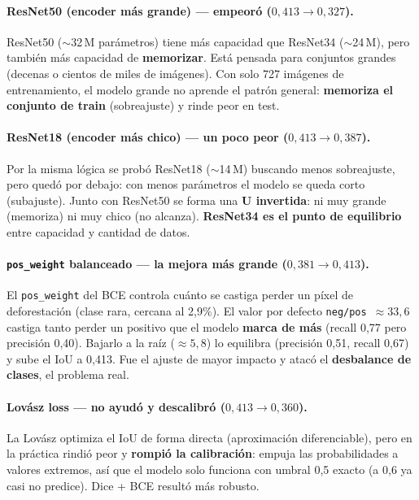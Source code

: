 \documentclass[onecolumn,conference]{IEEEtran}
\begin{document}
\paragraph{ResNet50 (encoder más grande) --- empeoró ($0{,}413 \to 0{,}327$).}
ResNet50 ($\sim$32\,M parámetros) tiene más capacidad que ResNet34 ($\sim$24\,M), pero
también más capacidad de \textbf{memorizar}. Está pensada para conjuntos grandes (decenas o
cientos de miles de imágenes). Con solo 727 imágenes de entrenamiento, el modelo grande no
aprende el patrón general: \textbf{memoriza el conjunto de train} (sobreajuste) y rinde
peor en test.

\paragraph{ResNet18 (encoder más chico) --- un poco peor ($0{,}413 \to 0{,}387$).}
Por la misma lógica se probó ResNet18 ($\sim$14\,M) buscando menos sobreajuste, pero quedó
por debajo: con menos parámetros el modelo se queda corto (subajuste). Junto con ResNet50
se forma una \textbf{U invertida}: ni muy grande (memoriza) ni muy chico (no alcanza).
\textbf{ResNet34 es el punto de equilibrio} entre capacidad y cantidad de datos.

\paragraph{\texttt{pos\_weight} balanceado --- la mejora más grande ($0{,}381 \to 0{,}413$).}
El \texttt{pos\_weight} del BCE controla cuánto se castiga perder un píxel de deforestación
(clase rara, cercana al 2,9\%). El valor por defecto \texttt{neg/pos}~$\approx 33{,}6$ castiga
tanto perder un positivo que el modelo \textbf{marca de más} (recall 0,77 pero precisión
0,40). Bajarlo a la raíz ($\approx 5{,}8$) lo equilibra (precisión 0,51, recall 0,67) y
sube el IoU a 0,413. Fue el ajuste de mayor impacto y atacó el \textbf{desbalance de
clases}, el problema real.

\paragraph{Lovász loss --- no ayudó y descalibró ($0{,}413 \to 0{,}360$).}
La Lovász optimiza el IoU de forma directa (aproximación diferenciable), pero en la
práctica rindió peor y \textbf{rompió la calibración}: empuja las probabilidades a valores
extremos, así que el modelo solo funciona con umbral 0,5 exacto (a 0,6 ya casi no predice).
Dice + BCE resultó más robusto.
\end{document}
